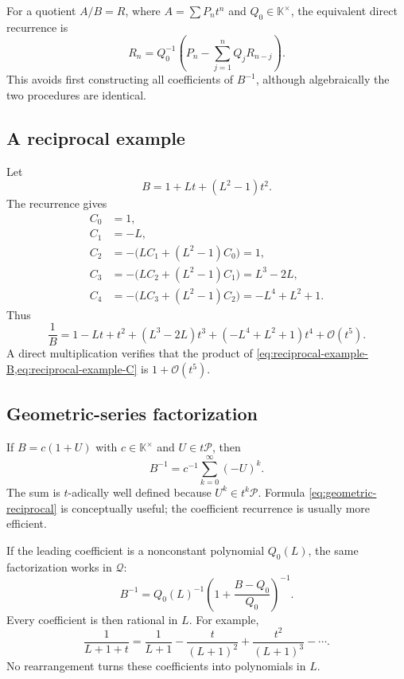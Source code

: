 \documentclass[11pt]{article}
\theoremstyle{pltheorem}
\newcommand{\K}{\mathbb K}
\newcommand{\PL}{\mathscr P}
\newcommand{\QPL}{\mathscr Q}
\newcommand{\bigO}{\mathcal O}
\begin{document}
For a quotient \(A/B=R\), where
\(A=\sum P_nt^n\) and \(Q_0\in\K^\times\), the equivalent direct recurrence is
\begin{equation}\label{eq:quotient-recurrence}
 R_n=Q_0^{-1}\left(P_n-\sum_{j=1}^{n}Q_jR_{n-j}\right).
\end{equation}
This avoids first constructing all coefficients of \(B^{-1}\), although algebraically the two procedures are identical.

\subsection{A reciprocal example}

Let
\begin{equation}\label{eq:reciprocal-example-B}
 B=1+Lt+(L^2-1)t^2.
\end{equation}
The recurrence gives
\begin{align*}
 C_0&=1,\\
 C_1&=-L,\\
 C_2&=-\bigl(LC_1+(L^2-1)C_0\bigr)=1,\\
 C_3&=-\bigl(LC_2+(L^2-1)C_1\bigr)=L^3-2L,\\
 C_4&=-\bigl(LC_3+(L^2-1)C_2\bigr)=-L^4+L^2+1.
\end{align*}
Thus
\begin{equation}\label{eq:reciprocal-example-C}
 \frac1B=1-Lt+t^2+(L^3-2L)t^3+(-L^4+L^2+1)t^4+\bigO(t^5).
\end{equation}
A direct multiplication verifies that the product of
\cref{eq:reciprocal-example-B,eq:reciprocal-example-C} is
\(1+\bigO(t^5)\).

\subsection{Geometric-series factorization}

If \(B=c(1+U)\) with \(c\in\K^\times\) and \(U\in t\PL\), then
\begin{equation}\label{eq:geometric-reciprocal}
 B^{-1}=c^{-1}\sum_{k=0}^{\infty}(-U)^k.
\end{equation}
The sum is \(t\)-adically well defined because \(U^k\in t^k\PL\).  Formula \cref{eq:geometric-reciprocal} is conceptually useful; the coefficient recurrence is usually more efficient.

If the leading coefficient is a nonconstant polynomial \(Q_0(L)\), the same factorization works in \(\QPL\):
\begin{equation}\label{eq:rational-leading-reciprocal}
 B^{-1}=Q_0(L)^{-1}
 \left(1+\frac{B-Q_0}{Q_0}\right)^{-1}.
\end{equation}
Every coefficient is then rational in \(L\).  For example,
\begin{equation}\label{eq:nonclosure-example}
 \frac1{L+1+t}
 =\frac1{L+1}-\frac{t}{(L+1)^2}
 +\frac{t^2}{(L+1)^3}-\cdots.
\end{equation}
No rearrangement turns these coefficients into polynomials in \(L\).
\end{document}
